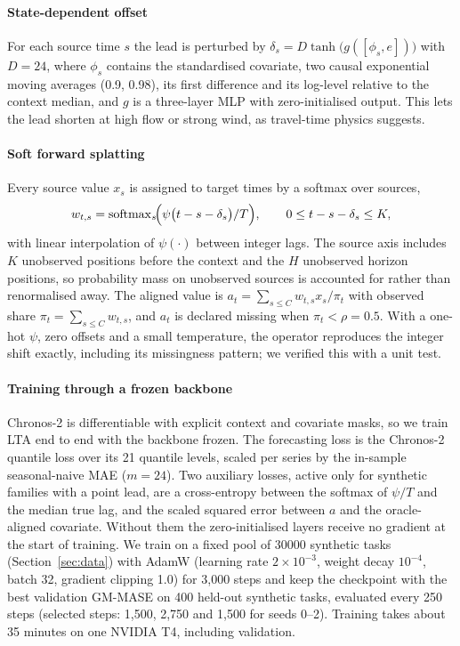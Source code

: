 \documentclass[preprint,11pt,authoryear]{elsarticle}
\newcommand{\lta}{\textsc{LTA}}
\begin{document}
\paragraph{State-dependent offset} For each source time $s$ the lead is perturbed by $\delta_s = D\tanh\bigl(g([\phi_s, e])\bigr)$ with $D=24$, where $\phi_s$ contains the standardised covariate, two causal exponential moving averages (0.9, 0.98), its first difference and its log-level relative to the context median, and $g$ is a three-layer MLP with zero-initialised output. This lets the lead shorten at high flow or strong wind, as travel-time physics suggests.

\paragraph{Soft forward splatting} Every source value $x_s$ is assigned to target times by a softmax over sources,
\begin{equation}
w_{t,s} = \operatorname{softmax}_s\!\Bigl(\psi\bigl(t-s-\delta_s\bigr)/T\Bigr),\qquad 0\le t-s-\delta_s\le K,
\end{equation}
with linear interpolation of $\psi(\cdot)$ between integer lags. The source axis includes $K$ unobserved positions before the context and the $H$ unobserved horizon positions, so probability mass on unobserved sources is accounted for rather than renormalised away. The aligned value is $a_t = \sum_{s\le C} w_{t,s} x_s / \pi_t$ with observed share $\pi_t=\sum_{s\le C} w_{t,s}$, and $a_t$ is declared missing when $\pi_t<\rho=0.5$. With a one-hot $\psi$, zero offsets and a small temperature, the operator reproduces the integer shift exactly, including its missingness pattern; we verified this with a unit test.

\paragraph{Training through a frozen backbone} Chronos-2 is differentiable with explicit context and covariate masks, so we train \lta{} end to end with the backbone frozen. The forecasting loss is the Chronos-2 quantile loss over its 21 quantile levels, scaled per series by the in-sample seasonal-naive MAE ($m=24$). Two auxiliary losses, active only for synthetic families with a point lead, are a cross-entropy between the softmax of $\psi/T$ and the median true lag, and the scaled squared error between $a$ and the oracle-aligned covariate. Without them the zero-initialised layers receive no gradient at the start of training. We train on a fixed pool of \num{30000} synthetic tasks (Section~\ref{sec:data}) with AdamW (learning rate $2\times10^{-3}$, weight decay $10^{-4}$, batch 32, gradient clipping 1.0) for 3,000 steps and keep the checkpoint with the best validation GM-MASE on 400 held-out synthetic tasks, evaluated every 250 steps (selected steps: 1,500, 2,750 and 1,500 for seeds 0--2). Training takes about 35 minutes on one NVIDIA T4, including validation.
\end{document}
